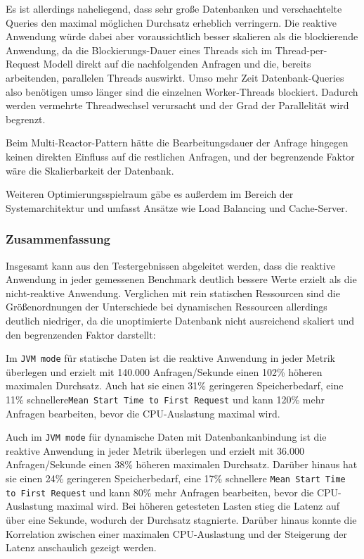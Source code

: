Es ist allerdings naheliegend, dass sehr große Datenbanken und verschachtelte Queries den maximal möglichen Durchsatz erheblich verringern.
Die reaktive Anwendung würde dabei aber voraussichtlich besser skalieren als die blockierende Anwendung, da die Blockierungs-Dauer
eines Threads sich im Thread-per-Request Modell direkt auf die nachfolgenden Anfragen und die, bereits arbeitenden, parallelen Threads
auswirkt. Umso mehr Zeit Datenbank-Queries also benötigen umso länger sind die einzelnen Worker-Threads blockiert. Dadurch werden
vermehrte Threadwechsel verursacht und der Grad der Parallelität wird begrenzt.

Beim Multi-Reactor-Pattern hätte die Bearbeitungsdauer der Anfrage hingegen keinen direkten Einfluss auf die restlichen Anfragen, und der
begrenzende Faktor wäre die Skalierbarkeit der Datenbank.

Weiteren Optimierungsspielraum gäbe es außerdem im Bereich der Systemarchitektur und umfasst Ansätze wie Load Balancing und Cache-Server.
\subsubsection{Zusammenfassung}
\label{subsubsec:auswertung_zusammenfassung}
Insgesamt kann aus den Testergebnissen abgeleitet werden, dass die reaktive Anwendung in jeder gemessenen
Benchmark deutlich bessere Werte erzielt als die nicht-reaktive Anwendung.
Verglichen mit rein statischen Ressourcen sind die Größenordnungen der Unterschiede bei dynamischen Ressourcen allerdings deutlich niedriger,
da die unoptimierte Datenbank nicht ausreichend skaliert und den begrenzenden Faktor darstellt:

Im \verb|JVM mode| für statische Daten ist die reaktive Anwendung in jeder Metrik überlegen und erzielt mit 140.000 Anfragen/Sekunde
einen 102\% höheren maximalen Durchsatz.
Auch hat sie einen 31\% geringeren Speicherbedarf, eine 11\% schnellere\newline \verb|Mean Start Time to First Request| und kann 120\% mehr Anfragen bearbeiten,
bevor die CPU-Auslastung maximal wird.

Auch im \verb|JVM mode| für dynamische Daten mit Datenbankanbindung ist die reaktive Anwendung in jeder Metrik überlegen und erzielt
mit 36.000 Anfragen/Sekunde einen 38\% höheren maximalen Durchsatz. Darüber hinaus hat sie einen 24\% geringeren Speicherbedarf, eine 17\% schnellere
\verb|Mean Start Time to First Request| und kann 80\% mehr Anfragen bearbeiten, bevor die CPU-Auslastung maximal wird.\newline
Bei höheren getesteten Lasten stieg die Latenz auf über eine Sekunde, wodurch der Durchsatz stagnierte. Darüber hinaus
konnte die Korrelation zwischen einer maximalen CPU-Auslastung und der Steigerung der Latenz anschaulich gezeigt werden.

